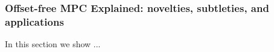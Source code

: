 
\subsubsection{Offset-free MPC Explained: novelties, subtleties, and applications}
\label{sec:OffsetFreeMPCExplained}

In this section we show ...